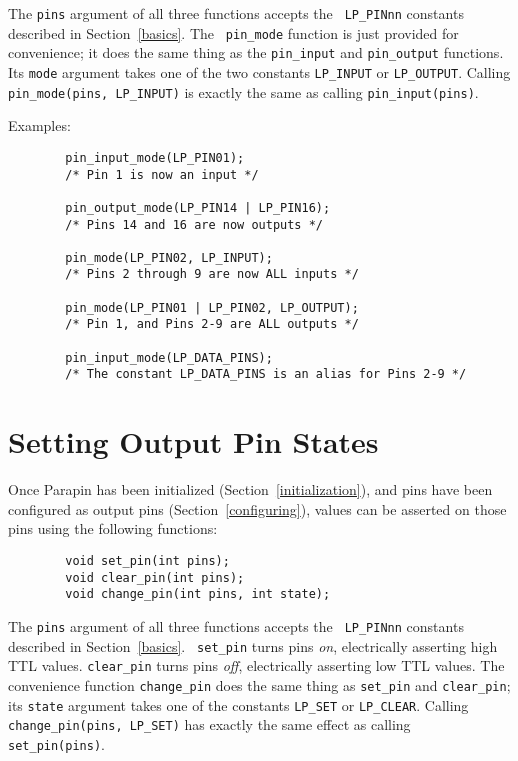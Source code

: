 \documentclass{article}
\begin{document}
The {\tt pins} argument of all three functions accepts the {\tt
LP\_PINnn} constants described in Section~\ref{basics}.  The {\tt
pin\_mode} function is just provided for convenience; it does the same
thing as the {\tt pin\_input} and {\tt pin\_output} functions.  Its
{\tt mode} argument takes one of the two constants {\tt LP\_INPUT} or
{\tt LP\_OUTPUT}.  Calling {\tt pin\_mode(pins, LP\_INPUT)} is exactly
the same as calling {\tt pin\_input(pins)}.

Examples:
\begin{verbatim}
        pin_input_mode(LP_PIN01);
        /* Pin 1 is now an input */

        pin_output_mode(LP_PIN14 | LP_PIN16);
        /* Pins 14 and 16 are now outputs */

        pin_mode(LP_PIN02, LP_INPUT);
        /* Pins 2 through 9 are now ALL inputs */

        pin_mode(LP_PIN01 | LP_PIN02, LP_OUTPUT);
        /* Pin 1, and Pins 2-9 are ALL outputs */

        pin_input_mode(LP_DATA_PINS);
        /* The constant LP_DATA_PINS is an alias for Pins 2-9 */
\end{verbatim}


\section{Setting Output Pin States}
\label{setandclear}

Once Parapin has been initialized (Section~\ref{initialization}), and
pins have been configured as output pins (Section~\ref{configuring}),
values can be asserted on those pins using the following functions:
\begin{verbatim}
        void set_pin(int pins);
        void clear_pin(int pins);
        void change_pin(int pins, int state);
\end{verbatim}

The {\tt pins} argument of all three functions accepts the {\tt
LP\_PINnn} constants described in Section~\ref{basics}.  {\tt
set\_pin} turns pins {\em on}, electrically asserting high TTL values.
{\tt clear\_pin} turns pins {\em off}, electrically asserting low TTL
values.  The convenience function {\tt change\_pin} does the same
thing as {\tt set\_pin} and {\tt clear\_pin}; its {\tt state} argument
takes one of the constants {\tt LP\_SET} or {\tt LP\_CLEAR}.
Calling {\tt change\_pin(pins, LP\_SET)} has exactly the same effect
as calling {\tt set\_pin(pins)}.
\end{document}
